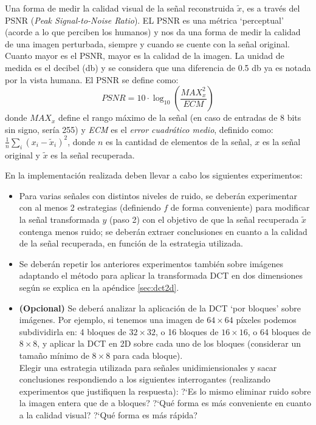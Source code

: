  
Una forma de medir la calidad visual de la se\~nal reconstruida $\tilde{x}$, es a trav\'es del PSNR ({\em Peak Signal-to-Noise Ratio}).
EL PSNR es una m\'etrica `perceptual' (acorde a lo que perciben los humanos) y nos da una forma de medir la calidad de una imagen perturbada, siempre y cuando se cuente con la se\~nal original. 
Cuanto mayor es el PSNR, mayor es la calidad de la imagen. La unidad de medida es el decibel (db) y se considera que una diferencia de 0.5 db ya es notada por la vista humana. El PSNR se define como:
$$
\mathit{PSNR} = 10 \cdot \log_{10} \left( \frac{\mathit{MAX}^2_x}{\mathit{ECM}} \right)
$$
donde $\mathit{MAX}_x$ define el rango m\'aximo de la se\~nal (en caso de entradas de 8 bits sin signo, ser\'ia 255) y \emph{ECM} es el {\em error cuadr\'atico medio}, definido como:
$ \frac{1}{n} \sum_{i}{(x_{i} - \tilde{x}_{i})^2} $,
donde $n$ es la cantidad de elementos de la se\~nal, $x$ es la se\~nal original y $\tilde{x}$ es la se\~nal recuperada.

En la implementaci\'on realizada deben llevar a cabo los siguientes experimentos:
\begin{itemize}
\item Para varias se\~nales con distintos niveles de ruido, se deber\'an experimentar con al menos 2 estrategias (definiendo $f$ de forma conveniente) para modificar la se\~nal transformada $y$ (paso 2) con el objetivo de que la se\~nal recuperada $\tilde{x}$ contenga menos ruido; se deber\'an extraer conclusiones en cuanto a la calidad de la se\~nal recuperada, en funci\'on de la estrategia utilizada.
\item Se deber\'an repetir los anteriores experimentos tambi\'en sobre im\'agenes adaptando el m\'etodo para aplicar la transformada DCT en dos dimensiones seg\'un se explica en la ap\'endice \ref{sec:dct2d}. 
\item {\bf (Opcional)} Se deber\'a analizar la aplicaci\'on de la DCT `por bloques' sobre im\'agenes. Por ejemplo, si tenemos una imagen de $64\times 64$ p\'ixeles podemos subdividirla en: 4 bloques de $32\times 32$, o 16 bloques de $16\times 16$, o 64 bloques de $8\times 8$, y aplicar la DCT en 2D sobre cada uno de los bloques (considerar un tama\~no m\'inimo de $8\times 8$ para cada bloque).\\ 
Elegir una estrategia utilizada para se\~nales unidimiensionales y sacar conclusiones respondiendo a los siguientes interrogantes (realizando experimentos que justifiquen la respuesta): ?`Es lo mismo eliminar ruido sobre la imagen entera que de a bloques? ?`Qu\'e forma es m\'as conveniente en cuanto a la calidad visual? ?`Qu\'e forma es m\'as r\'apida? 
\end{itemize}

